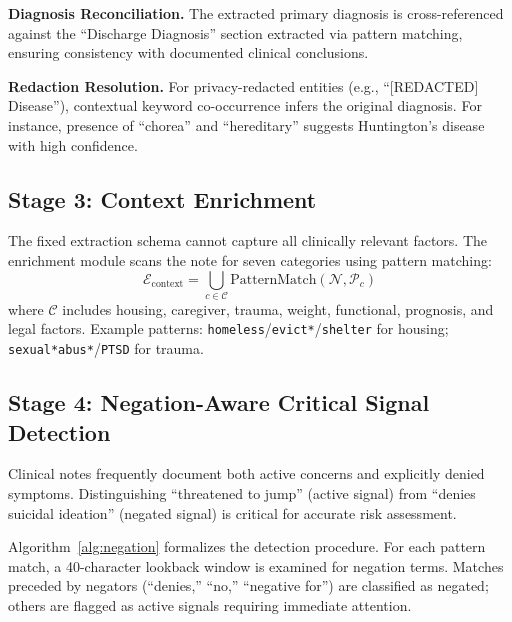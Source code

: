 \documentclass[conference]{IEEEtran}
\begin{document}
\textbf{Diagnosis Reconciliation.} The extracted primary diagnosis is cross-referenced against the ``Discharge Diagnosis'' section extracted via pattern matching, ensuring consistency with documented clinical conclusions.

\textbf{Redaction Resolution.} For privacy-redacted entities (e.g., ``[REDACTED] Disease''), contextual keyword co-occurrence infers the original diagnosis. For instance, presence of ``chorea'' and ``hereditary'' suggests Huntington's disease with high confidence.

\subsection{Stage 3: Context Enrichment}

The fixed extraction schema cannot capture all clinically relevant factors. The enrichment module scans the note for seven categories using pattern matching:
\begin{equation}
    \mathcal{E}_{\text{context}} = \bigcup_{c \in \mathcal{C}} \text{PatternMatch}(\mathcal{N}, \mathcal{P}_c)
\end{equation}
where $\mathcal{C}$ includes housing, caregiver, trauma, weight, functional, prognosis, and legal factors. Example patterns: \texttt{homeless}/\texttt{evict*}/\texttt{shelter} for housing; \texttt{sexual*abus*}/\texttt{PTSD} for trauma.

\subsection{Stage 4: Negation-Aware Critical Signal Detection}

Clinical notes frequently document both active concerns and explicitly denied symptoms. Distinguishing ``threatened to jump'' (active signal) from ``denies suicidal ideation'' (negated signal) is critical for accurate risk assessment.

Algorithm~\ref{alg:negation} formalizes the detection procedure. For each pattern match, a 40-character lookback window is examined for negation terms. Matches preceded by negators (``denies,'' ``no,'' ``negative for'') are classified as negated; others are flagged as active signals requiring immediate attention.
\end{document}

